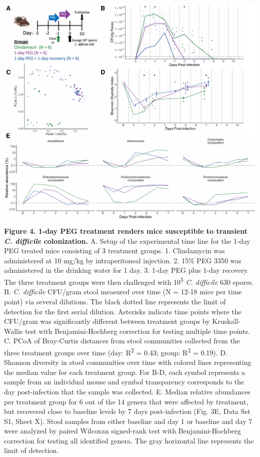 \documentclass[
  11pt,
]{article}
\begin{document}
\includegraphics{figure_4.pdf} \textbf{Figure 4. 1-day PEG treatment
renders mice susceptible to transient \emph{C. difficile} colonization.}
A. Setup of the experimental time line for the 1-day PEG treated mice
consisting of 3 treatment groups. 1. Clindamycin was administered at 10
mg/kg by intraperitoneal injection. 2. 15\% PEG 3350 was administered in
the drinking water for 1 day. 3. 1-day PEG plus 1-day recovery. The
three treatment groups were then challenged with 10\textsuperscript{5}
\emph{C. difficile} 630 spores. B. \emph{C. difficile} CFU/gram stool
measured over time (N = 12-18 mice per time point) via several
dilutions. The black dotted line represents the limit of detection for
the first serial dilution. Asterisks indicate time points where the
CFU/gram was significantly different between treatment groups by
Kruskall-Wallis test with Benjamini-Hochberg correction for testing
multiple time points. C. PCoA of Bray-Curtis distances from stool
communities collected from the three treatment groups over time (day:
R\textsuperscript{2} = 0.43; group: R\textsuperscript{2} = 0.19). D.
Shannon diversity in stool communities over time with colored lines
representing the median value for each treatment group. For B-D, each
symbol represents a sample from an individual mouse and symbol
transparency corresponds to the day post-infection that the sample was
collected. E. Median relative abundances per treatment group for 6 out
of the 14 genera that were affected by treatment, but recovered close to
baseline levels by 7 days post-infection (Fig. 3E, Data Set S1, Sheet
X). Stool samples from either baseline and day 1 or baseline and day 7
were analyzed by paired Wilcoxan signed-rank test with
Benjamini-Hochberg correction for testing all identified genera. The
gray horizontal line represents the limit of detection.
\end{document}

